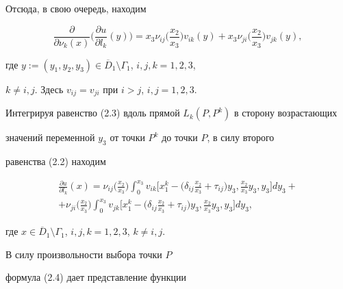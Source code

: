 \begin{pf}
Отсюда, в свою очередь, находим




\begin{equation}


\frac{\partial}{\partial \nu_k(x)}\bigg (\frac{\partial u}{\partial l_k}(y)


\bigg )=x_3\nu_{ij}\bigg (\frac{x_2}{x_3}\bigg )


v_{ik}(y)+x_3\nu_{ji}\bigg (\frac


{x_2}{x_3}\bigg )v_{jk}(y),


\end{equation}


где $y:=(y_1,y_2,y_3)\in \overline {D}_1 \setminus \Gamma_1$, $i,j,k=1,2,3$,


$k\ne i,j$. Здесь $v_{ij}=v_{ji}$ при $i>j$, $i,j=1,2,3$.





Интегрируя равенство (2.3) вдоль прямой $L_k(P,P^k)$ в сторону возрастающих


значений переменной $y_3$ от точки $P^k$ до точки $P$, в силу второго


равенства (2.2) находим




\begin{multline}


\frac{\partial u}{\partial l_k}(x)=\nu_{ij}\bigg (\frac{x_2}{x_3}\bigg )


\int_0^{x_3}v_{ik}\bigg


[x_1^k-\bigg (\delta_{ij}\frac{x_2}{x_3}+\tau_{ij}\bigg )


y_3,\frac{x_2}{x_3}y_3,y_3\bigg ]dy_3+\\


+\nu_{ji}\bigg (\frac{x_2}{x_3}\bigg )


\int_0^{x_3} v_{jk}\bigg [x_1^k-\bigg (


\delta_{ij}\frac{x_2}{x_3}+\tau_{ij}\bigg )


y_3,\frac{x_2}{x_3}y_3,y_3\bigg ]dy_3,


\end{multline}


где $x \in \overline D_1 \setminus \Gamma_1$, $i,j,k=1,2,3$, $k \ne i,j$.





В силу произвольности выбора точки $P$ 


формула (2.4) дает представление функции



\end{pf}
